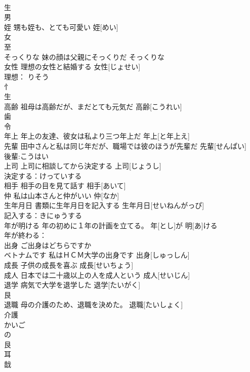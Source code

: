 \documentclass[8pt]{extreport}
\begin{document}
\begin{CJK}{UTF8}{min}
\\	生 
\\	男 
\\	姪	甥も姪も、とても可愛い	姪[めい]			
\\	女 
\\	至 
\\	そっくりな	妹の顔は父親にそっくりだ	そっくりな			
\\	女性	理想の女性と結婚する	女性[じょせい]	
\\	理想： りそう
\\	忄 
\\	生 
\\	高齢	祖母は高齢だが、まだとても元気だ	高齢[こうれい]			
\\	歯 
\\	令 
\\	年上	年上の友達、彼女は私より三つ年上だ	年上[と年上え]			
\\	先輩	田中さんと私は同じ年だが、職場では彼のほうが先輩だ	先輩[せんぱい]			
\\	後輩:こうはい
\\	上司	上司に相談してから決定する	上司[じょうし]			
\\	決定する：けっていする
\\	相手	相手の目を見て話す	相手[あいて]			
\\	仲	私は山本さんと仲がいい	仲[なか]			
\\	生年月日	書類に生年月日を記入する	生年月日[せいねんがっぴ]			
\\	記入する：きにゅうする
\\	年が明ける	年の初めに１年の計画を立てる。	年[とし]が 明[あ]ける			
\\	年が終わる：
\\	出身	ご出身はどちらですか 
\\	ベトナムです 私はＨＣＭ大学の出身です	出身[しゅっしん]			
\\	成長	子供の成長を喜ぶ	成長[せいちょう]			
\\	成人	日本では二十歳以上の人を成人という	成人[せいじん]			
\\	退学	病気で大学を退学した	退学[たいがく]			
\\	艮 
\\	退職	母の介護のため、退職を決めた。	退職[たいしょく]			
\\	介護 
\\	かいご
\\	の 
\\	艮 
\\	耳 
\\	戠 

\end{CJK}
\end{document}
